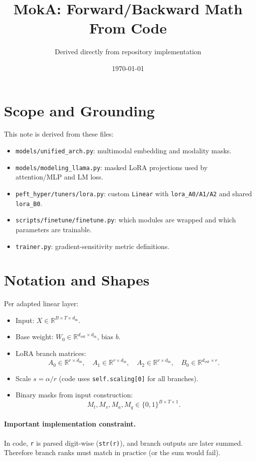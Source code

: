 \documentclass[11pt]{article}
\title{MokA: Forward/Backward Math From Code}
\author{Derived directly from repository implementation}
\date{\today}
\begin{document}
\maketitle

\section{Scope and Grounding}
This note is derived from these files:
\begin{itemize}
\item \texttt{models/unified\_arch.py}: multimodal embedding and modality masks.
\item \texttt{models/modeling\_llama.py}: masked LoRA projections used by attention/MLP and LM loss.
\item \texttt{peft\_hyper/tuners/lora.py}: custom \texttt{Linear} with \texttt{lora\_A0/A1/A2} and shared \texttt{lora\_B0}.
\item \texttt{scripts/finetune/finetune.py}: which modules are wrapped and which parameters are trainable.
\item \texttt{trainer.py}: gradient-sensitivity metric definitions.
\end{itemize}

\section{Notation and Shapes}
Per adapted linear layer:
\begin{itemize}
\item Input: $X \in \mathbb{R}^{B\times T\times d_{\text{in}}}$.
\item Base weight: $W_0 \in \mathbb{R}^{d_{\text{out}}\times d_{\text{in}}}$, bias $b$.
\item LoRA branch matrices:
\[
A_0\in\mathbb{R}^{r\times d_{\text{in}}},\quad
A_1\in\mathbb{R}^{r\times d_{\text{in}}},\quad
A_2\in\mathbb{R}^{r\times d_{\text{in}}},\quad
B_0\in\mathbb{R}^{d_{\text{out}}\times r}.
\]
\item Scale $s=\alpha/r$ (code uses \texttt{self.scaling[0]} for all branches).
\item Binary masks from input construction:
\[
M_t,M_v,M_a,M_q\in\{0,1\}^{B\times T\times 1}.
\]
\end{itemize}

\paragraph{Important implementation constraint.}
In code, \texttt{r} is parsed digit-wise (\texttt{str(r)}), and branch outputs are later summed. Therefore branch ranks must match in practice (or the sum would fail).
\end{document}
